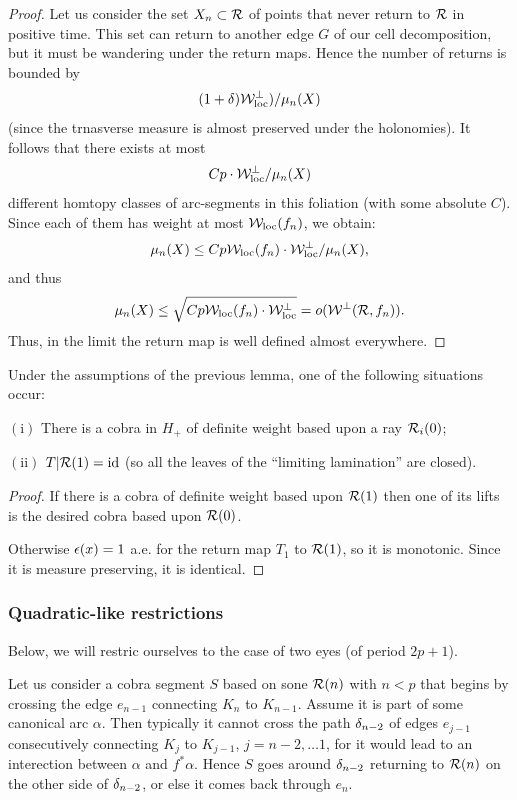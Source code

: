 {{\begin{proof}
Let us consider the set $X_n\subset {\mathcal R}$ of points that
  never return to ${\mathcal R}$ in positive time. 
This set can return to another edge $G$ of our cell decomposition,
but it must be   wandering  under the return maps.  Hence the number
of returns is bounded by   
$$
       (1+{\delta})  {\mathcal W}^\perp_{\mathrm{loc}}) /\mu_n(X)
$$
(since the  trnasverse measure is almost preserved  under the
holonomies). 
It follows that there exists at most 
$$
   C p\cdot  {\mathcal W}^\perp_{\mathrm{loc}}  /\mu_n(X)
$$
different homtopy classes of arc-segments in this foliation (with some
absolute $C$). Since each of them has weight at most ${\mathcal W}_{\mathrm{loc}}(f_n) $, we
obtain:
$$
  \mu_n(X)  \leq Cp{\mathcal W}_{\mathrm{loc}} (f_n)\cdot  {\mathcal W}^\perp_{\mathrm{loc}}
  /\mu_n(X),
$$
and thus
$$
   \mu_n(X) \leq \sqrt{Cp{\mathcal W}_{\mathrm{loc}} (f_n)\cdot 
      {\mathcal W}^\perp_{\mathrm{loc}} } = o({\mathcal W}^\perp({\mathcal R}, f_n )). 
$$
Thus, in the limit the return map is well defined almost everywhere. 
\end{proof}

\begin{lem}
  Under the assumptions of the previous lemma,  one of the following
  situations occur:

\ssk \nin $\mathrm{ (i)}$ There is a cobra in $H_+$ of definite weight based upon  a
ray ${\mathcal R}_i(0)$;

\ssk \nin $\mathrm {(ii)}  $  $T|{\mathcal R}(1) =\operatorname{id}$ (so all the leaves of the ``limiting lamination'' are closed). 
\end{lem}

\begin{proof}
  If there is a cobra of definite weight based upon ${\mathcal R}(1)$ then
  one of its lifts is the desired cobra based upon ${\mathcal R}(0)$.  

Otherwise ${\epsilon}(x)=1$ a.e. for the return map $T_1$  to ${\mathcal R}(1)$, so it is
monotonic. Since it is measure preserving, it is identical. 
\end{proof} 

\msk
\subsubsection{Quadratic-like restrictions}
Below, we will restric ourselves to the case of two eyes
(of period $2p+1$). 

Let us consider a cobra segment $S$ based on sone ${\mathcal R}(n)$ with $n<p$
that begins by crossing  the edge $e_{n-1} $  connecting $K_n$ to $K_{n-1}$.
Assume it is part of some canonical arc $\alpha$.  Then typically it cannot cross the
path ${\delta}_{n-2}$ of edges $e_{j-1}$ consecutively connecting $K_j$ to $K_{j-1}$,  $j=n-2,\dots
1$, for it would lead to an interection between $\alpha$ and $f^* \alpha$. Hence $S$
goes around  ${\delta}_{n-2}$  returning to ${\mathcal R}(n)$ on the other side of ${\delta}_{n-2}$, or else
it comes back through $e_n$.  

}}
